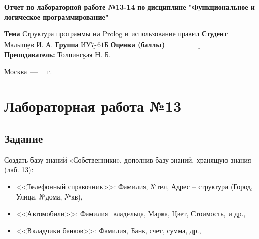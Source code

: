 \documentclass[12pt]{report}
\begin{document}
\begin{titlepage}
		
		\begin{center}
			\noindent\begin{minipage}{1.3\textwidth}\centering
				\Large\textbf{  Отчет по лабораторной работе №13-14}\newline
				\textbf{по дисциплине \newline "Функциональное и логическое программирование"}\newline\newline
			\end{minipage}
		\end{center}
		
		\noindent\textbf{Тема} $\underline{\text{Структура программы на Prolog и использование правил}}$\newline\newline
		\noindent\textbf{Студент} $\underline{\text{Малышев И. А.}}$\newline\newline
		\noindent\textbf{Группа} $\underline{\text{ИУ7-61Б}}$\newline\newline
		\noindent\textbf{Оценка (баллы)} $\underline{\text{~~~~~~~~~~~~~~~~~~~~~~~~~~~}}$\newline\newline
		\noindent\textbf{Преподаватель: } $\underline{\text{Толпинская Н. Б.}}$\newline\newline\newline
		
		\begin{center}
			\vfill
			Москва~---~\the\year
			~г.
		\end{center}
	\end{titlepage}
	
	
	\setcounter{page}{2}

\chapter*{Лабораторная работа №13}
\section*{Задание}

Создать базу знаний «Собственники», дополнив базу знаний, хранящую знания (лаб. 13):

\begin{itemize}
	\item <<Телефонный справочник>>: Фамилия, №тел, Адрес – структура (Город, Улица, №дома, №кв),
	\item <<Автомобили>>: Фамилия\_владельца, Марка, Цвет, Стоимость, и др.,
	\item <<Вкладчики банков>>: Фамилия, Банк, счет, сумма, др.,
\end{itemize}
\end{document}
